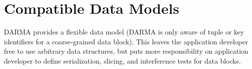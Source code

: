 
\section{Compatible Data Models}
\label{sec:data_model}


DARMA provides a flexible data model (DARMA is only aware of tuple or key identifiers for a coarse-grained data block).
This leaves the application developer free to use arbitrary data structures, but puts more responsibility on application developer to define serialization, \gls{slicing}, and \glspl{interference test} 
for data blocks. 



